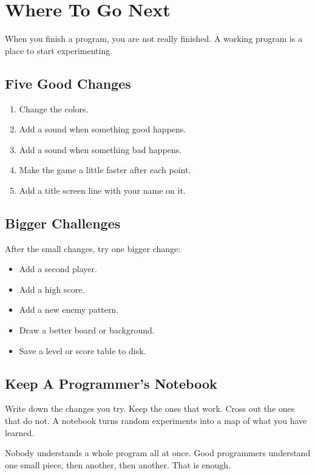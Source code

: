 \chapter*{Where To Go Next}
{}

When you finish a program, you are not really finished. A working program is a
place to start experimenting.

\section*{Five Good Changes}
{}

\begin{enumerate}
\item Change the colors.
\item Add a sound when something good happens.
\item Add a sound when something bad happens.
\item Make the game a little faster after each point.
\item Add a title screen line with your name on it.
\end{enumerate}

\section*{Bigger Challenges}
{}

After the small changes, try one bigger change:

\begin{itemize}
\item Add a second player.
\item Add a high score.
\item Add a new enemy pattern.
\item Draw a better board or background.
\item Save a level or score table to disk.
\end{itemize}

\section*{Keep A Programmer's Notebook}
{}

Write down the changes you try. Keep the ones that work. Cross out the ones
that do not. A notebook turns random experiments into a map of what you have
learned.

\begin{typeinbox}[title=One Last Secret]
Nobody understands a whole program all at once. Good programmers understand one
small piece, then another, then another. That is enough.
\end{typeinbox}
